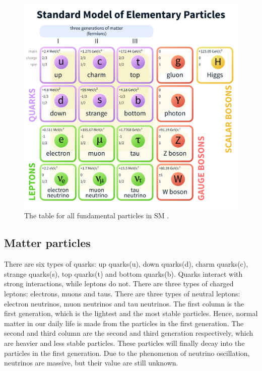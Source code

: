\begin{figure}
\centering
\includegraphics[width=\textwidth]{data/photo/theory/SM_particles.png}
\caption{The table for all fundamental particles in SM \cite{SM_particles}.}
\label{fig:SM_particles}
\end{figure}

\subsection{Matter particles}
There are six types of quarks: up quarks(u), down quarks(d), charm quarks(c), strange quarks(s), top quarks(t) and bottom quarks(b).
Quarks interact with strong interactions, while leptons do not.
There are three types of charged leptons: electrons, muons and taus.
There are three types of neutral leptons: electron neutrinos, muon neutrinos and tau neutrinos.
The first column is the first generation, which is the lightest and the most stable particles.
Hence, normal matter in our daily life is made from the particles in the first generation.
The second and third column are the second and third generation respectively, which are heavier and less stable particles.
These particles will finally decay into the particles in the first generation.
Due to the phenomenon of neutrino oscillation, neutrinos are massive, but their value are still unknown.

